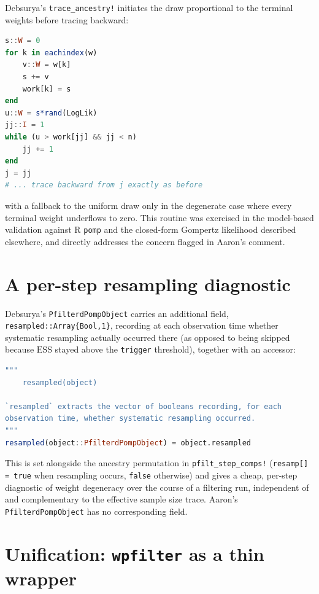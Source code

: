 \documentclass[10pt]{article}
\newcommand{\ESS}{\mathrm{ESS}}
\begin{document}
Debsurya's \texttt{trace\_ancestry!} initiates the draw proportional to the
terminal weights before tracing backward:
\begin{lstlisting}[language=Julia, caption={Debsurya's weighted \texttt{trace\_ancestry!} (PartiallyObservedMarkovProcesses.jl/src/pfilter.jl, lines 518--554), initiation step}]
s::W = 0
for k in eachindex(w)
    v::W = w[k]
    s += v
    work[k] = s
end
u::W = s*rand(LogLik)
jj::I = 1
while (u > work[jj] && jj < n)
    jj += 1
end
j = jj
# ... trace backward from j exactly as before
\end{lstlisting}
with a fallback to the uniform draw only in the degenerate case where every
terminal weight underflows to zero. This routine was exercised in the
model-based validation against R \texttt{pomp} and the closed-form Gompertz
likelihood described elsewhere, and directly addresses the concern flagged
in Aaron's comment.

\section{A per-step resampling diagnostic}
\label{sec:resampled}

Debsurya's \texttt{PfilterdPompObject} carries an additional field,
\texttt{resampled::Array\{Bool,1\}}, recording at each observation time
whether systematic resampling actually occurred there (as opposed to being
skipped because $\ESS$ stayed above the \texttt{trigger} threshold), together
with an accessor:
\begin{lstlisting}[language=Julia, caption={PartiallyObservedMarkovProcesses.jl/src/pfilter.jl, lines 29--35}]
"""
    resampled(object)

`resampled` extracts the vector of booleans recording, for each
observation time, whether systematic resampling occurred.
"""
resampled(object::PfilterdPompObject) = object.resampled
\end{lstlisting}
This is set alongside the ancestry permutation in \texttt{pfilt\_step\_comps!}
(\texttt{resamp[] = true} when resampling occurs, \texttt{false} otherwise)
and gives a cheap, per-step diagnostic of weight degeneracy over the course
of a filtering run, independent of and complementary to the effective
sample size trace. Aaron's \texttt{PfilterdPompObject} has no corresponding
field.

\section{Unification: \texttt{wpfilter} as a thin wrapper}
\label{sec:unification}
\end{document}
